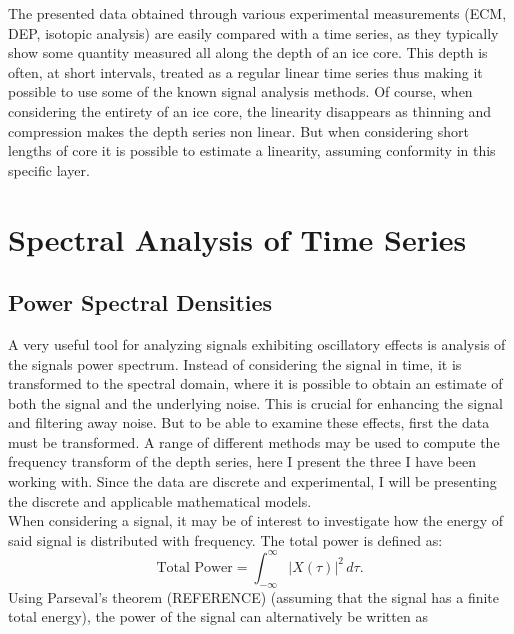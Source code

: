 \documentclass[../../CompleteThesis2/Complete_2ndDraft]{subfiles}
\begin{document}
The presented data obtained through various experimental measurements (ECM, DEP, isotopic analysis) are easily compared with a time series, as they typically show some quantity measured all along the depth of an ice core. This depth is often, at short intervals, treated as a regular linear time series thus making it possible to use some of the known signal analysis methods. Of course, when considering the entirety of an ice core, the linearity disappears as thinning and compression makes the depth series non linear. But when considering short lengths of core it is possible to estimate a linearity, assuming conformity in this specific layer. 



\section[Spectral Transforms]{Spectral Analysis of Time Series}
\label{Sec:SignalAnalysis_SpectralAnalysis}

\subsection[PSD][PSD]{Power Spectral Densities}
\label{Subsec:SignalAnalysis_BackDiffusion_SpectralAnalysis_PSD}
A very useful tool for analyzing signals exhibiting oscillatory effects is analysis of the signals power spectrum. Instead of considering the signal in time, it is transformed to the spectral domain, where it is possible to obtain an estimate of both the signal and the underlying noise. This is crucial for enhancing the signal and filtering away noise. But to be able to examine these effects, first the data must be transformed. A range of different methods may be used to compute the frequency transform of the depth series, here I present the three I have been working with. Since the data are discrete and experimental, I will be presenting the discrete and applicable mathematical models.\\
When considering a signal, it may be of interest to investigate how the energy of said signal is distributed with frequency. The total power is defined as:
\begin{equation}
	\text{Total Power} = \int_{-\infty}^{\infty} |X(\tau)|^2 \, d\tau.
	\label{Eq:SignalEnergy}
\end{equation}
Using Parseval's theorem (REFERENCE) (assuming that the signal has a finite total energy), the power of the signal can alternatively be written as
\end{document}
